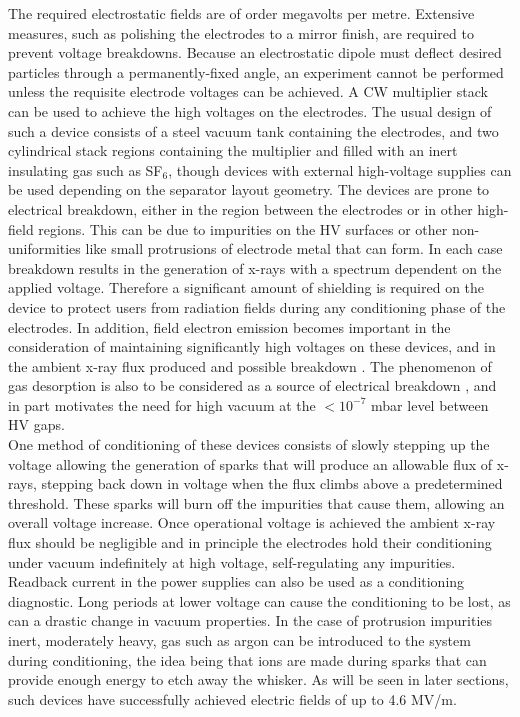 The required electrostatic fields are of order megavolts per metre.  Extensive measures, such as polishing the electrodes to a mirror finish, are required to prevent voltage breakdowns.   Because an electrostatic dipole must deflect desired particles through a permanently-fixed angle,  an experiment  cannot be performed unless the requisite   electrode voltages can be achieved. A CW multiplier stack can be used to achieve the high voltages on the electrodes. The usual design of such a device consists of a steel vacuum tank containing the electrodes, and two cylindrical stack regions containing the multiplier and filled  with an inert insulating gas such as SF$_{6}$, though devices with external high-voltage supplies can be used depending on the separator layout geometry. The devices are prone to electrical breakdown, either in the region between the electrodes or in other high-field regions. This can be due to impurities on the HV surfaces or other non-uniformities like small protrusions of electrode metal that can form. In each case breakdown results in the generation of x-rays with a spectrum dependent on the applied voltage. Therefore a significant amount of shielding is required on the device to protect users from radiation fields during any conditioning phase of the electrodes. In addition, field electron emission becomes important in the consideration of maintaining significantly high voltages on these devices, and in the ambient x-ray flux produced and possible breakdown \cite{Dia98a}. The phenomenon of gas desorption is also to be considered as a source of electrical breakdown \cite{Dia98b}, and in part motivates the need for high vacuum at the $<10^{-7}$ mbar level between HV gaps. 
\\
One method of conditioning of these devices consists of slowly stepping up the voltage allowing the generation of sparks that will produce an allowable flux of x-rays, stepping back down in voltage when the flux climbs above a predetermined threshold. These sparks will burn off the impurities that cause them, allowing an overall voltage increase. Once operational voltage is achieved the ambient x-ray flux should be negligible and in principle the electrodes hold their conditioning under vacuum indefinitely at high voltage, self-regulating any impurities. Readback current in the power supplies can also be used as a conditioning diagnostic. Long periods at lower voltage can cause the conditioning to be lost, as can a drastic change in vacuum properties. In the case of protrusion impurities inert, moderately heavy, gas such as argon can be introduced to the system during conditioning, the idea being that ions are made during sparks that can provide enough energy to etch away the whisker. As will be seen in later sections, such devices have successfully achieved electric fields of up to 4.6 MV/m.  

